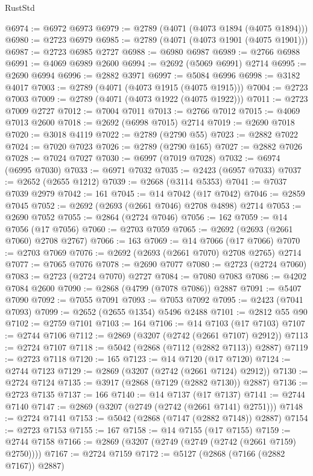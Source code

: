 \begin{lexlean}{RustStd}
\begin{coremodule}
{\begin{coremodule}
{{{{{{{{{{{{{{{{{{{{{{{{{{{{{{{{{{{{{{{@6974 := @6972 @6973
@6979 := @2789 (@4071 (@4073 @1894 (@4075 @1894)))
@6980 := @2723 @6979
@6985 := @2789 (@4071 (@4073 @1901 (@4075 @1901)))
@6987 := @2723 @6985 @2727
@6988 := @6980 @6987
@6989 := @2766 @6988
@6991 := @4069 @6989 @2600
@6994 := @2692 (@5069 @6991) @2714
@6995 := @2690 @6994
@6996 := @2882 @3971
@6997 := @5084 @6996
@6998 := @3182 @4017
@7003 := @2789 (@4071 (@4073 @1915 (@4075 @1915)))
@7004 := @2723 @7003
@7009 := @2789 (@4071 (@4073 @1922 (@4075 @1922)))
@7011 := @2723 @7009 @2727
@7012 := @7004 @7011
@7013 := @2766 @7012
@7015 := @4069 @7013 @2600
@7018 := @2692 (@6998 @7015) @2714
@7019 := @2690 @7018
@7020 := @3018 @4119
@7022 := @2789 (@2790 @55)
@7023 := @2882 @7022
@7024 := @7020 @7023
@7026 := @2789 (@2790 @165)
@7027 := @2882 @7026
@7028 := @7024 @7027
@7030 := @6997 (@7019 @7028)
@7032 := @6974 (@6995 @7030)
@7033 := @6971 @7032
@7035 := @2423 (@6957 @7033)
@7037 := @2652 (@2655 @1212)
@7039 := @2668 (@3114 @5353)
@7041 := @7037 @7039 @2979
@7042 := 161
@7045 := @14 @7042 (@17 @7042)
@7046 := @2859 @7045
@7052 := @2692 (@2693 (@2661 @7046) @2708 @4898) @2714
@7053 := @2690 @7052
@7055 := @2864 (@2724 @7046)
@7056 := 162
@7059 := @14 @7056 (@17 @7056)
@7060 := @2703 @7059
@7065 := @2692 (@2693 (@2661 @7060) @2708 @2767)
@7066 := 163
@7069 := @14 @7066 (@17 @7066)
@7070 := @2703 @7069
@7076 := @2692 (@2693 (@2661 @7070) @2708 @2765) @2714
@7077 := @7065 @7076
@7078 := @2690 @7077
@7080 := @2723 (@2724 @7060)
@7083 := @2723 (@2724 @7070) @2727
@7084 := @7080 @7083
@7086 := @4202 @7084 @2600
@7090 := @2868 (@4799 (@7078 @7086)) @2887
@7091 := @5407 @7090
@7092 := @7055 @7091
@7093 := @7053 @7092
@7095 := @2423 (@7041 @7093)
@7099 := @2652 (@2655 @1354) @5496 @2488
@7101 := @2812 @55 @90
@7102 := @2759 @7101
@7103 := 164
@7106 := @14 @7103 (@17 @7103)
@7107 := @2744 @7106
@7112 := @2869 (@3207 (@2742 (@2661 @7107) @2912))
@7113 := @2724 @7107
@7118 := @5042 (@2868 (@7112 (@2882 @7113)) @2887)
@7119 := @2723 @7118
@7120 := 165
@7123 := @14 @7120 (@17 @7120)
@7124 := @2744 @7123
@7129 := @2869 (@3207 (@2742 (@2661 @7124) @2912))
@7130 := @2724 @7124
@7135 := @3917 (@2868 (@7129 (@2882 @7130)) @2887)
@7136 := @2723 @7135
@7137 := 166
@7140 := @14 @7137 (@17 @7137)
@7141 := @2744 @7140
@7147 := @2869 (@3207 (@2749 (@2742 (@2661 @7141) @2751)))
@7148 := @2724 @7141
@7153 := @5042 (@2868 (@7147 (@2882 @7148)) @2887)
@7154 := @2723 @7153
@7155 := 167
@7158 := @14 @7155 (@17 @7155)
@7159 := @2744 @7158
@7166 := @2869 (@3207 (@2749 (@2749 (@2742 (@2661 @7159) @2750))))
@7167 := @2724 @7159
@7172 := @5127 (@2868 (@7166 (@2882 @7167)) @2887)
}}}}}}}}}}}}}}}}}}}}}}}}}}}}}}}}}}}}}}}
\end{coremodule}}
\end{coremodule}
\end{lexlean}
